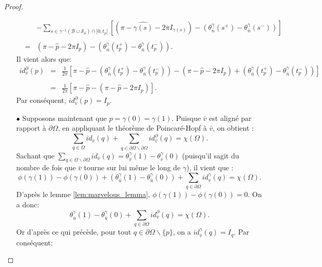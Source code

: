 \begin{proof}
\begin{itemize}
\begin{eqnarray*}
            &&-\sum_{s\in\gamma^{-1}(\mathcal{B}\cup\mathcal{S}_{\bar{n}})\cap[0, t_p[}\left[\left(\pi-\widehat{\gamma(s)}-2\pi I_{\gamma(s)}\right)-\left(\theta^{\gamma}_{\bar{n}}(s^+) - \theta^{\gamma}_{\bar{n}}(s^-)\right)\right]\\\\
            &=&\left(\pi-\widehat{p}-2\pi I_p\right)-\left(\theta^{\gamma}_{\bar{n}}(t_p^+) - \theta^{\gamma}_{\bar{n}}(t_p^-)\right).
        \end{eqnarray*}
        Il vient alors que:
        \begin{eqnarray*}
        id^\partial_{\bar{v}}(p)&=&\displaystyle\frac{1}{2\pi}\left[\pi-\widehat{p}-\left(\theta^{\gamma}_{\bar{n}}(t_p^+) - \theta^{\gamma}_{\bar{n}}(t_p^-)\right)-\left(\pi-\widehat{p}-2\pi I_p\right)+\left(\theta^{\gamma}_{\bar{n}}(t_p^+) - \theta^{\gamma}_{\bar{n}}(t_p^-)\right)\right]\\\\
        &=&\displaystyle\frac{1}{2\pi}\left[\pi-\widehat{p}-\left(\pi-\widehat{p}-2\pi I_p\right)\right].
        \end{eqnarray*}
        Par conséquent, $id^\partial_{\bar{v}}(p)=I_p$.\\
        \item[$\bullet$] Supposons maintenant que $p=\gamma(0)=\gamma(1)$. Puisque $\bar{v}$ est aligné par rapport à $\partial\Omega$, en appliquant le théorème de Poincaré-Hopf à $\bar{v}$, on obtient :
        $$
        \sum_{q\in\Omega} id_{\bar{v}}(q)+\sum_{q\in\partial\Omega\backslash\partial\Omega} id^\partial_{\bar{v}}(q)=\chi(\Omega).
        $$
        Sachant que $\sum_{q\in\Omega\backslash\partial\Omega}id_{\bar{v}}(q)=\theta_{\bar{v}}^\gamma(1)-\theta_{\bar{v}}^\gamma(0)$ (puisqu'il sagit du nombre de fois que $\bar{v}$ tourne sur lui même le long de $\gamma$), il vient que :
        $$
        \phi(\gamma(1))-\phi(\gamma(0))+\left(\theta_{\bar{u}}^\gamma(1)-\theta_{\bar{u}}^\gamma(0)\right)+\sum_{q\in\partial\Omega}id_{\bar{v}}^\gamma(q)=\chi(\Omega).
        $$
        D'après le lemme \ref{lem:marvelous_lemma}, $\phi(\gamma(1))-\phi(\gamma(0))=0$. On a donc:
        $$
        \theta_{\bar{u}}^\gamma(1)-\theta_{\bar{u}}^\gamma(0)+\sum_{q\in\partial\Omega} id^\partial_{\bar{v}}(q)=\chi(\Omega).
        $$
        Or d'après ce qui précède, pour tout $q\in\partial\Omega\backslash\{p\}$, on a $id_{\bar{v}}^\gamma(q)=I_q$. Par conséquent:

\end{itemize}
\end{proof}
